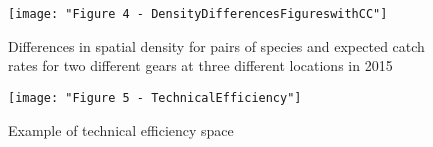 \documentclass{nature}
\begin{document}
\begin{figure}
\begin{center}
	\texttt{[image: "Figure 4 - DensityDifferencesFigureswithCC"]}
	\label{fig:4}
	\caption{Differences in spatial density for pairs of species and
		expected catch rates for two different gears at three different
	locations in 2015}
\end{center}
\end{figure}

\begin{figure}
\begin{center}
	\texttt{[image: "Figure 5 - TechnicalEfficiency"]}
	\label{fig:5}
	\caption{Example of technical efficiency space}
\end{center}
\end{figure}
\end{document}
